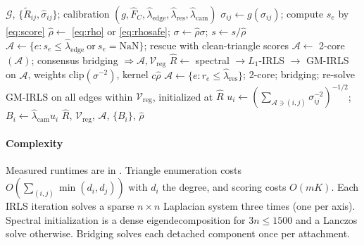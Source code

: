\begin{algorithm}[t]
\caption{CARA on one test scene}\label{alg:cara}
\begin{algorithmic}[1]
\Require $\mathcal{G}$, $\{\tilde R_{ij},\hat\sigma_{ij}\}$; calibration $(g,\hat F_C,\hat\lambda_{\mathrm{edge}},\hat\lambda_{\mathrm{res}},\hat\lambda_{\mathrm{cam}})$
\State $\sigma_{ij}\gets g(\hat\sigma_{ij})$; compute $s_e$ by \eqref{eq:score}
\State $\hat\rho\gets$ \eqref{eq:rho} or \eqref{eq:rhosafe}; $\sigma\gets\hat\rho\sigma$; $s\gets s/\hat\rho$
\State $\mathcal{A}\gets\{e: s_e\le\hat\lambda_{\mathrm{edge}}\ \text{or}\ s_e=\mathrm{NaN}\}$; rescue with clean-triangle scores
\State $\mathcal{A}\gets$ 2-core$(\mathcal{A})$; consensus bridging $\Rightarrow\mathcal{A},\mathcal{V}_{\mathrm{reg}}$
\State $\hat R\gets$ spectral $\to L_1$-IRLS $\to$ GM-IRLS on $\mathcal{A}$, weights clip$(\sigma^{-2})$, kernel $c\hat\rho$
\State $\mathcal{A}\gets\{e:r_e\le\hat\lambda_{\mathrm{res}}\}$; 2-core; bridging; re-solve
\State GM-IRLS on all edges within $\mathcal{V}_{\mathrm{reg}}$, initialized at $\hat R$
\State $u_i\gets(\sum_{\mathcal{A}\ni(i,j)}\sigma_{ij}^{-2})^{-1/2}$; $B_i\gets\hat\lambda_{\mathrm{cam}}u_i$
\State \Return $\hat R$, $\mathcal{V}_{\mathrm{reg}}$, $\mathcal{A}$, $\{B_i\}$, $\hat\rho$
\end{algorithmic}
\end{algorithm}

\paragraph*{Complexity} Measured runtimes are in . Triangle enumeration costs $O(\sum_{(i,j)}\min(d_i,d_j))$ with $d_i$ the degree, and scoring costs $O(mK)$. Each IRLS iteration solves a sparse $n\times n$ Laplacian system three times (one per axis). Spectral initialization is a dense eigendecomposition for $3n\le1500$ and a Lanczos solve otherwise. Bridging solves each detached component once per attachment.
